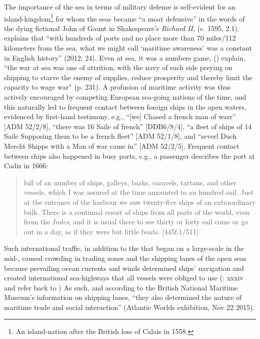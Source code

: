 The importance of the sea in terms of military defense is self-evident for an island-kingdom\footnote{An island-nation after the British loss of Calais in 1558.} for whom the seas became “a moat defensive” in the words of the dying fictional John of Gaunt in Shakespeare’s \textit{Richard II,} (c. 1595, 2.1). \citeauthor{Bicheno2012} explains that “with hundreds of ports and no place more than 70 miles/112 kilometers from the sea, what we might call ‘maritime awareness’ was a constant in English history” (2012: 24). Even at sea, it was a numbers game, (\citealt{AdkinsAdkins2008}) explain, “the war at sea was one of attrition, with the navy of each side preying on  shipping to starve the enemy of supplies, reduce prosperity and thereby limit the capacity to wage war” (p. 231). A profusion of maritime activity was thus actively encouraged by competing European sea-going nations of the time, and this naturally led to frequent contact between foreign ships in the open waters, evidenced by first-hand testimony, e.g., “[we] Chased a french man of warr” [ADM 52/2/8], “there was 16 Saile of french” [DDB6/8/4], “a fleet of ships of 14 Saile Supposing them to be a french fleet” [ADM 52/1/8], and “severl Duch Mercht Shipps with a Man of war came in” [ADM 52/2/5]. Frequent contact between ships also happened in busy ports, e.g., a passenger describes the port at Cadiz in 1666:

\begin{quotation}
full of an  number of ships, galleys, barks, caravels, tartans, and other vessels, which I was assured at the time amounted to an hundred sail. Just at the entrance of the harbour we saw twenty-five ships of an extraordinary bulk. There is a continual resort of ships from all parts of the world, even from the \textit{Indes}; and it is usual there to see thirty or forty sail come or go out in a day, as if they were but little boats. [445f.1/511] 
\end{quotation}

Such international traffic, in addition to the   that began on a large-scale in the mid-, caused crowding in trading zones and the shipping lanes of the open seas because prevailing ocean currents and winds determined ships’ navigation and created international sea-highways that all vessels were obliged to use (\citealt{AdkinsAdkins2008}: xxxiv and refer back to ) As such, and according to the British National Maritime Museum’s information on shipping lanes, “they also determined the nature of maritime trade and social interaction” (Atlantic Worlds exhibition, Nov 22 2015).  

